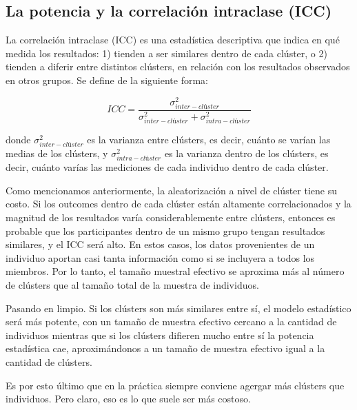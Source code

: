 \documentclass[
  letterpaper,
  DIV=11,
  numbers=noendperiod,
  oneside]{scrreprt}
\begin{document}
\hypertarget{la-potencia-y-la-correlaciuxf3n-intraclase-icc}{%
\subsection{La potencia y la correlación intraclase
(ICC)}\label{la-potencia-y-la-correlaciuxf3n-intraclase-icc}}

La correlación intraclase (ICC) es una estadística descriptiva que
indica en qué medida los resultados: 1) tienden a ser similares dentro
de cada clúster, o 2) tienden a diferir entre distintos clústers, en
relación con los resultados observados en otros grupos. Se define de la
siguiente forma:

\[
ICC = \frac{\sigma^2_{inter-clúster}}{\sigma^2_{inter-clúster} + \sigma^2_{intra-clúster}}
\]

donde \(\sigma^2_{inter-clúster}\) es la varianza entre clústers, es
decir, cuánto se varían las medias de los clústers, y
\(\sigma^2_{intra-clúster}\) es la varianza dentro de los clústers, es
decir, cuánto varías las mediciones de cada individuo dentro de cada
clúster.

Como mencionamos anteriormente, la aleatorización a nivel de clúster
tiene su costo. Si los outcomes dentro de cada clúster están altamente
correlacionados y la magnitud de los resultados varía considerablemente
entre clústers, entonces es probable que los participantes dentro de un
mismo grupo tengan resultados similares, y el ICC será alto. En estos
casos, los datos provenientes de un individuo aportan casi tanta
información como si se incluyera a todos los miembros. Por lo tanto, el
tamaño muestral efectivo se aproxima más al número de clústers que al
tamaño total de la muestra de individuos.

Pasando en limpio. Si los clústers son más similares entre sí, el modelo
estadístico será más potente, con un tamaño de muestra efectivo cercano
a la cantidad de individuos mientras que si los clústers difieren mucho
entre sí la potencia estadística cae, aproximándonos a un tamaño de
muestra efectivo igual a la cantidad de clústers.

Es por esto último que en la práctica siempre conviene agergar más
clústers que individuos. Pero claro, eso es lo que
suele ser más costoso.
\end{document}
